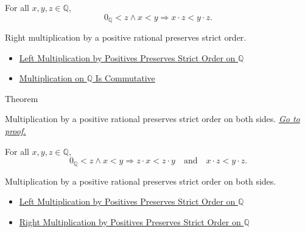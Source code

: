 \begin{remark*}
For all $x,y,z\in\mathbb{Q}$,
\[
0_{\mathbb{Q}}<z\land x<y
\Longrightarrow
x\cdot z<y\cdot z.
\]
\end{remark*}

\begin{remark*}[Interpretation]
Right multiplication by a positive rational preserves strict order.
\end{remark*}

\begin{dependencies}
\begin{itemize}
  \item \hyperref[thm:left-positive-multiplication-preserves-strict-order-on-q]{Left Multiplication by Positives Preserves Strict Order on $\mathbb{Q}$}
  \item \hyperref[thm:multiplication-on-q-commutative]{Multiplication on $\mathbb{Q}$ Is Commutative}
\end{itemize}
\end{dependencies}

\begin{theorembox}{Theorem}
\begin{theorem}
\label{thm:positive-multiplication-preserves-strict-order-on-q}
Multiplication by a positive rational preserves strict order on both sides.
\hyperref[prf:positive-multiplication-preserves-strict-order-on-q]{\textit{Go to proof.}}
\end{theorem}
\end{theorembox}

\begin{remark*}
For all $x,y,z\in\mathbb{Q}$,
\[
0_{\mathbb{Q}}<z\land x<y
\Longrightarrow
z\cdot x<z\cdot y
\quad\text{and}\quad
x\cdot z<y\cdot z.
\]
\end{remark*}

\begin{remark*}[Interpretation]
Multiplication by a positive rational preserves strict order on both sides.
\end{remark*}

\begin{dependencies}
\begin{itemize}
  \item \hyperref[thm:left-positive-multiplication-preserves-strict-order-on-q]{Left Multiplication by Positives Preserves Strict Order on $\mathbb{Q}$}
  \item \hyperref[cor:right-positive-multiplication-preserves-strict-order-on-q]{Right Multiplication by Positives Preserves Strict Order on $\mathbb{Q}$}
\end{itemize}
\end{dependencies}

